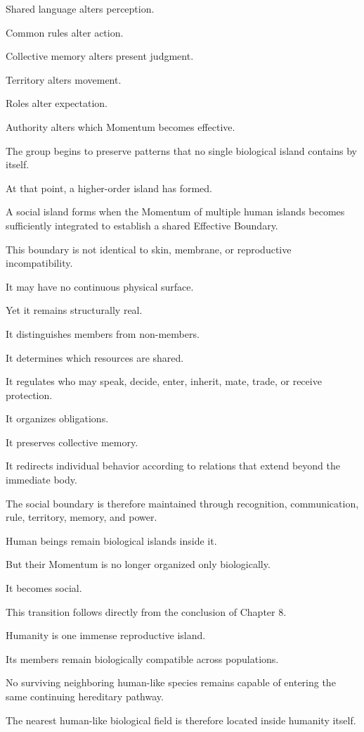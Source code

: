 Shared language alters perception.

Common rules alter action.

Collective memory alters present judgment.

Territory alters movement.

Roles alter expectation.

Authority alters which Momentum becomes effective.

The group begins to preserve patterns that no single biological island contains by itself.

At that point, a higher-order island has formed.

A social island forms when the Momentum of multiple human islands becomes sufficiently integrated to establish a shared Effective Boundary.

This boundary is not identical to skin, membrane, or reproductive incompatibility.

It may have no continuous physical surface.

Yet it remains structurally real.

It distinguishes members from non-members.

It determines which resources are shared.

It regulates who may speak, decide, enter, inherit, mate, trade, or receive protection.

It organizes obligations.

It preserves collective memory.

It redirects individual behavior according to relations that extend beyond the immediate body.

The social boundary is therefore maintained through recognition, communication, rule, territory, memory, and power.

Human beings remain biological islands inside it.

But their Momentum is no longer organized only biologically.

It becomes social.

This transition follows directly from the conclusion of Chapter 8.

Humanity is one immense reproductive island.

Its members remain biologically compatible across populations.

No surviving neighboring human-like species remains capable of entering the same continuing hereditary pathway.

The nearest human-like biological field is therefore located inside humanity itself.

